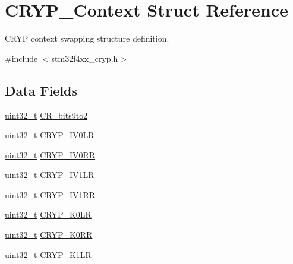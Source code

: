 \hypertarget{struct_c_r_y_p___context}{\section{C\-R\-Y\-P\-\_\-\-Context Struct Reference}
\label{struct_c_r_y_p___context}
}


C\-R\-Y\-P context swapping structure definition.  




{\ttfamily \#include $<$stm32f4xx\-\_\-cryp.\-h$>$}

\subsection*{Data Fields}
\begin{DoxyCompactItemize}
\item 
\hyperlink{stdint_8h_a435d1572bf3f880d55459d9805097f62}{uint32\-\_\-t} \hyperlink{struct_c_r_y_p___context_ad8cccfe37789c5a9054cbe8a7164d897}{C\-R\-\_\-bits9to2}
\item 
\hyperlink{stdint_8h_a435d1572bf3f880d55459d9805097f62}{uint32\-\_\-t} \hyperlink{struct_c_r_y_p___context_af926fa464ab0fc37594ddd79169d9cd0}{C\-R\-Y\-P\-\_\-\-I\-V0\-L\-R}
\item 
\hyperlink{stdint_8h_a435d1572bf3f880d55459d9805097f62}{uint32\-\_\-t} \hyperlink{struct_c_r_y_p___context_ad77ea3171d87c278b42b984a6c308943}{C\-R\-Y\-P\-\_\-\-I\-V0\-R\-R}
\item 
\hyperlink{stdint_8h_a435d1572bf3f880d55459d9805097f62}{uint32\-\_\-t} \hyperlink{struct_c_r_y_p___context_a05a18344be993efec4b12d61b2281009}{C\-R\-Y\-P\-\_\-\-I\-V1\-L\-R}
\item 
\hyperlink{stdint_8h_a435d1572bf3f880d55459d9805097f62}{uint32\-\_\-t} \hyperlink{struct_c_r_y_p___context_aafdd5ed6c7cafe8f45aabc5401501bf7}{C\-R\-Y\-P\-\_\-\-I\-V1\-R\-R}
\item 
\hyperlink{stdint_8h_a435d1572bf3f880d55459d9805097f62}{uint32\-\_\-t} \hyperlink{struct_c_r_y_p___context_a487ca545522aeb881483717c16bcbc06}{C\-R\-Y\-P\-\_\-\-K0\-L\-R}
\item 
\hyperlink{stdint_8h_a435d1572bf3f880d55459d9805097f62}{uint32\-\_\-t} \hyperlink{struct_c_r_y_p___context_adbf073d605f7a85eda04a306f65ad195}{C\-R\-Y\-P\-\_\-\-K0\-R\-R}
\item 
\hyperlink{stdint_8h_a435d1572bf3f880d55459d9805097f62}{uint32\-\_\-t} \hyperlink{struct_c_r_y_p___context_a3f36964d098cc8ae308b2e5383d347d3}{C\-R\-Y\-P\-\_\-\-K1\-L\-R}

\end{DoxyCompactItemize}
